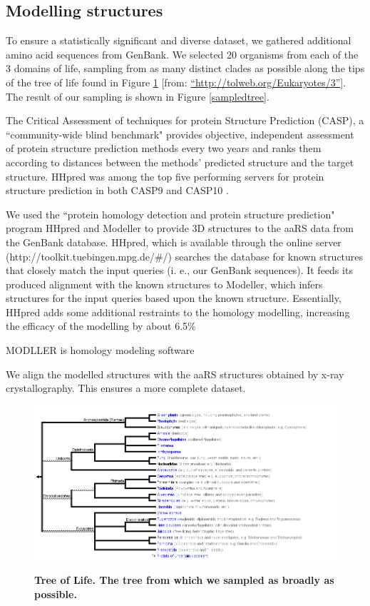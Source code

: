 \documentclass[10pt,letterpaper]{article}
\begin{document}
\subsection*{Modelling structures}
To ensure a statistically significant and diverse dataset, we gathered additional amino acid sequences from GenBank.  
We selected 20 organisms from each of the 3 domains of life, sampling from as many distinct clades as possible along the tips of the tree of life found in Figure \ref{treeoflife} [from: \hyperref[label_name]{``http://tolweb.org/Eukaryotes/3''}]. 
The result of our sampling is shown in Figure \ref{sampledtree}.

The Critical Assessment of techniques for protein Structure Prediction (CASP), a ``community-wide blind benchmark" provides objective, independent assessment of protein structure prediction methods every two years and ranks them according to distances between the methods' predicted structure and the target structure. \cite{CASP} 
HHpred was among the top five performing servers for protein structure prediction in both CASP9 \cite{CASP9} and CASP10 \cite{CASP10}.



We used the ``protein homology detection and protein structure prediction" program HHpred \cite{HHpred} and Modeller \cite{Modeller} to provide 3D structures to the aaRS data from the GenBank database.  
HHpred, which is available through the online server (http://toolkit.tuebingen.mpg.de/\#/) searches the database for known structures that closely match the input queries (i. e., our GenBank sequences).  
It feeds its produced alignment with the known structures to Modeller, which infers structures for the input queries based upon the known structure.
Essentially, HHpred adds some additional restraints to the homology modelling, increasing the efficacy of the modelling by about 6.5\% \cite{HHpred1}

MODLLER is homology modeling software 

We align the modelled structures with the aaRS structures obtained by x-ray crystallography.  This ensures a more complete dataset.


\begin{figure}
  \caption{\bf Tree of Life.  The tree from which we sampled as broadly as possible.}
  \centering
    \includegraphics[width=\textwidth]{Eukaryotes.png}
  \label{treeoflife}  
\end{figure}
\end{document}
